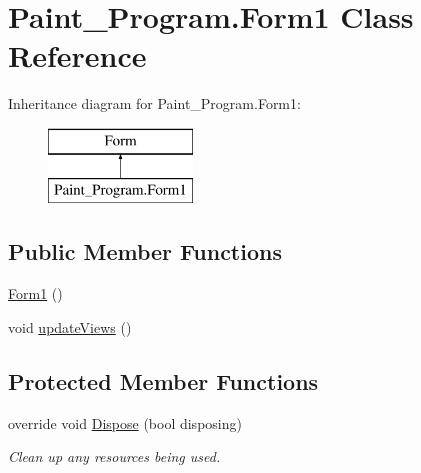 \hypertarget{class_paint___program_1_1_form1}{}\section{Paint\+\_\+\+Program.\+Form1 Class Reference}
\label{class_paint___program_1_1_form1}
Inheritance diagram for Paint\+\_\+\+Program.\+Form1\+:\begin{figure}[H]
\begin{center}
\leavevmode
\includegraphics[height=2.000000cm]{class_paint___program_1_1_form1}
\end{center}
\end{figure}
\subsection*{Public Member Functions}
\begin{DoxyCompactItemize}
\item 
\mbox{\hyperlink{class_paint___program_1_1_form1_aefb0d3ee7baac9f44e9d742615ec526d}{Form1}} ()
\item 
void \mbox{\hyperlink{class_paint___program_1_1_form1_a7ca574edd68281cfcfbf4826f2a6723a}{update\+Views}} ()
\end{DoxyCompactItemize}
\subsection*{Protected Member Functions}
\begin{DoxyCompactItemize}
\item 
override void \mbox{\hyperlink{class_paint___program_1_1_form1_a0bd4c16e36005c28132ae0785f626e90}{Dispose}} (bool disposing)
\begin{DoxyCompactList}\small\item\em Clean up any resources being used. \end{DoxyCompactList}\end{DoxyCompactItemize}
